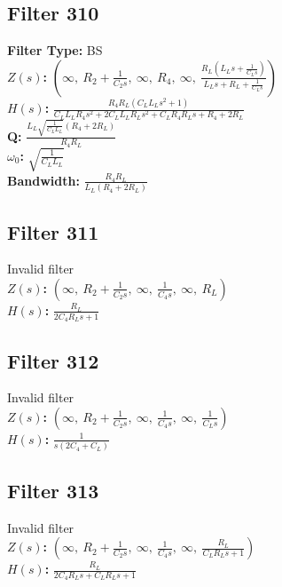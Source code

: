 \documentclass{article}
\begin{document}
\subsection*{Filter 310}
\textbf{Filter Type:} BS \\ 
\textbf{$Z(s)$:} $\left( \infty, \  R_{2} + \frac{1}{C_{2} s}, \  \infty, \  R_{4}, \  \infty, \  \frac{R_{L} \left(L_{L} s + \frac{1}{C_{L} s}\right)}{L_{L} s + R_{L} + \frac{1}{C_{L} s}}\right)$ \\ 
\textbf{$H(s)$:} $\frac{R_{4} R_{L} \left(C_{L} L_{L} s^{2} + 1\right)}{C_{L} L_{L} R_{4} s^{2} + 2 C_{L} L_{L} R_{L} s^{2} + C_{L} R_{4} R_{L} s + R_{4} + 2 R_{L}}$ \\ 
\textbf{Q:} $\frac{L_{L} \sqrt{\frac{1}{C_{L} L_{L}}} \left(R_{4} + 2 R_{L}\right)}{R_{4} R_{L}}$ \\ 
\textbf{$\omega_0$:} $\sqrt{\frac{1}{C_{L} L_{L}}}$ \\ 
\textbf{Bandwidth:} $\frac{R_{4} R_{L}}{L_{L} \left(R_{4} + 2 R_{L}\right)}$ \\ 
\subsection*{Filter 311}
Invalid filter \\ 
\textbf{$Z(s)$:} $\left( \infty, \  R_{2} + \frac{1}{C_{2} s}, \  \infty, \  \frac{1}{C_{4} s}, \  \infty, \  R_{L}\right)$ \\ 
\textbf{$H(s)$:} $\frac{R_{L}}{2 C_{4} R_{L} s + 1}$ \\ 
\subsection*{Filter 312}
Invalid filter \\ 
\textbf{$Z(s)$:} $\left( \infty, \  R_{2} + \frac{1}{C_{2} s}, \  \infty, \  \frac{1}{C_{4} s}, \  \infty, \  \frac{1}{C_{L} s}\right)$ \\ 
\textbf{$H(s)$:} $\frac{1}{s \left(2 C_{4} + C_{L}\right)}$ \\ 
\subsection*{Filter 313}
Invalid filter \\ 
\textbf{$Z(s)$:} $\left( \infty, \  R_{2} + \frac{1}{C_{2} s}, \  \infty, \  \frac{1}{C_{4} s}, \  \infty, \  \frac{R_{L}}{C_{L} R_{L} s + 1}\right)$ \\ 
\textbf{$H(s)$:} $\frac{R_{L}}{2 C_{4} R_{L} s + C_{L} R_{L} s + 1}$ \\ 
\end{document}
